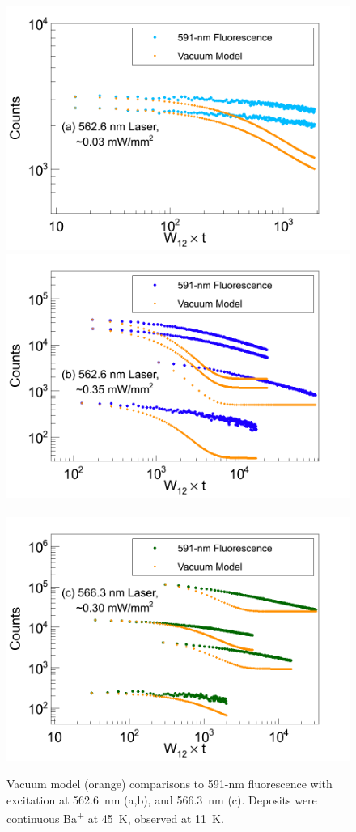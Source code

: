 \begin{figure} %
        \centering
                \includegraphics[width=.5\textwidth]{figures/bleach_model_vacuum_w12t_a.png}
                \includegraphics[width=.5\textwidth]{figures/bleach_model_vacuum_w12t_b.png}
                ~
                \includegraphics[width=.5\textwidth]{figures/bleach_model_vacuum_w12t_c.png}
                \caption{Vacuum model (orange) comparisons to 591-nm fluorescence with excitation at 562.6~nm (a,b), and 566.3~nm (c).  Deposits were continuous Ba\textsuperscript{+} at 45~K, observed at 11~K.}
\label{fig:bleach_model_vac}
\end{figure}

